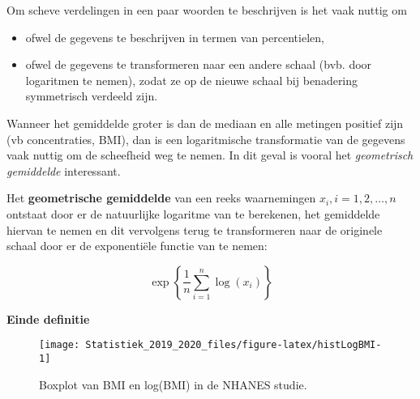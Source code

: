 \documentclass[12pt,dutch,coursenotes]{book}
\newenvironment{Shaded}{\begin{snugshade}}{\end{snugshade}}
\newcommand{\KeywordTok}[1]{\textcolor[rgb]{0.13,0.29,0.53}{\textbf{#1}}}
\newcommand{\DataTypeTok}[1]{\textcolor[rgb]{0.13,0.29,0.53}{#1}}
\newcommand{\DecValTok}[1]{\textcolor[rgb]{0.00,0.00,0.81}{#1}}
\newcommand{\StringTok}[1]{\textcolor[rgb]{0.31,0.60,0.02}{#1}}
\newcommand{\OperatorTok}[1]{\textcolor[rgb]{0.81,0.36,0.00}{\textbf{#1}}}
\newcommand{\NormalTok}[1]{#1}
\providecommand{\tightlist}{%
  \setlength{\itemsep}{0pt}\setlength{\parskip}{0pt}}
\theoremstyle{definition}
\theoremstyle{definition}
\theoremstyle{definition}
\theoremstyle{remark}
\let\BeginKnitrBlock\begin \let\EndKnitrBlock\end
\begin{document}
Om scheve verdelingen in een paar woorden te beschrijven is het vaak
nuttig om

\begin{itemize}
\tightlist
\item
  ofwel de gegevens te beschrijven in termen van percentielen,
\item
  ofwel de gegevens te transformeren naar een andere schaal (bvb. door
  logaritmen te nemen), zodat ze op de nieuwe schaal bij benadering
  symmetrisch verdeeld zijn.
\end{itemize}

Wanneer het gemiddelde groter is dan de mediaan en alle metingen
positief zijn (vb concentraties, BMI), dan is een logaritmische
transformatie van de gegevens vaak nuttig om de scheefheid weg te nemen.
In dit geval is vooral het \emph{geometrisch gemiddelde} interessant.

\BeginKnitrBlock{definition}[geometrisch gemiddelde]
\protect\hypertarget{def:unnamed-chunk-43}{}{\label{def:unnamed-chunk-43}
\iffalse (geometrisch gemiddelde) \fi{} }Het \textbf{geometrische
gemiddelde} van een reeks waarnemingen \(x_i, i=1, 2, \dots, n\)
ontstaat door er de natuurlijke logaritme van te berekenen, het
gemiddelde hiervan te nemen en dit vervolgens terug te transformeren
naar de originele schaal door er de exponentiële functie van te nemen:

\begin{equation*}
\exp\left\{\frac{1}{n} \sum_{i=1}^n \log(x_i)\right\}
\end{equation*}

\textbf{Einde definitie}
\EndKnitrBlock{definition}

\begin{Shaded}
\end{Shaded}

\begin{figure}

{\centering \texttt{[image: Statistiek\_2019\_2020\_files/figure-latex/histLogBMI-1]} 

}

\caption{Boxplot van BMI en log(BMI) in de NHANES studie.}\label{fig:histLogBMI}
\end{figure}
\end{document}

